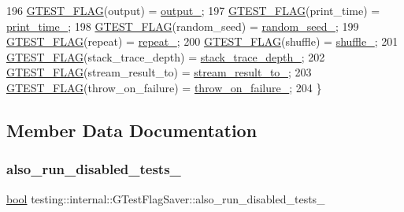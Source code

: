 \begin{DoxyCode}
196     \hyperlink{gtest-port_8h_a828f4e34a1c4b510da50ec1563e3562a}{GTEST\_FLAG}(output) = \hyperlink{classtesting_1_1internal_1_1GTestFlagSaver_a65da6ec2943af0a71343efc0e5e96286}{output\_};
197     \hyperlink{gtest-port_8h_a828f4e34a1c4b510da50ec1563e3562a}{GTEST\_FLAG}(print\_time) = \hyperlink{classtesting_1_1internal_1_1GTestFlagSaver_a3a5791fa995e8fd348683afa1d5b0150}{print\_time\_};
198     \hyperlink{gtest-port_8h_a828f4e34a1c4b510da50ec1563e3562a}{GTEST\_FLAG}(random\_seed) = \hyperlink{classtesting_1_1internal_1_1GTestFlagSaver_a58abf7990f96e4c8ebee143fbcbb8840}{random\_seed\_};
199     \hyperlink{gtest-port_8h_a828f4e34a1c4b510da50ec1563e3562a}{GTEST\_FLAG}(repeat) = \hyperlink{classtesting_1_1internal_1_1GTestFlagSaver_a4c6949cb53b5a89568649d34f8abb5f6}{repeat\_};
200     \hyperlink{gtest-port_8h_a828f4e34a1c4b510da50ec1563e3562a}{GTEST\_FLAG}(shuffle) = \hyperlink{classtesting_1_1internal_1_1GTestFlagSaver_af69cb62f7ee26542dd8588507142b478}{shuffle\_};
201     \hyperlink{gtest-port_8h_a828f4e34a1c4b510da50ec1563e3562a}{GTEST\_FLAG}(stack\_trace\_depth) = \hyperlink{classtesting_1_1internal_1_1GTestFlagSaver_a42573c1d61af50aae7e855cb1be07d8d}{stack\_trace\_depth\_};
202     \hyperlink{gtest-port_8h_a828f4e34a1c4b510da50ec1563e3562a}{GTEST\_FLAG}(stream\_result\_to) = \hyperlink{classtesting_1_1internal_1_1GTestFlagSaver_a603db2b9ec601e80c18af84b4f5faa13}{stream\_result\_to\_};
203     \hyperlink{gtest-port_8h_a828f4e34a1c4b510da50ec1563e3562a}{GTEST\_FLAG}(throw\_on\_failure) = \hyperlink{classtesting_1_1internal_1_1GTestFlagSaver_a9fc0b96db6debd9ff80032eb4c84dc28}{throw\_on\_failure\_};
204   \}
\end{DoxyCode}


\subsection{Member Data Documentation}
\mbox{\label{classtesting_1_1internal_1_1GTestFlagSaver_ad940f8cb0287f0498abfbb8cd3f63676}} 
\subsubsection{\texorpdfstring{also\+\_\+run\+\_\+disabled\+\_\+tests\+\_\+}{also\_run\_disabled\_tests\_}}
{\footnotesize\ttfamily \hyperlink{classbool}{bool} testing\+::internal\+::\+G\+Test\+Flag\+Saver\+::also\+\_\+run\+\_\+disabled\+\_\+tests\+\_\+\hspace{0.3cm}{\ttfamily [private]}}




